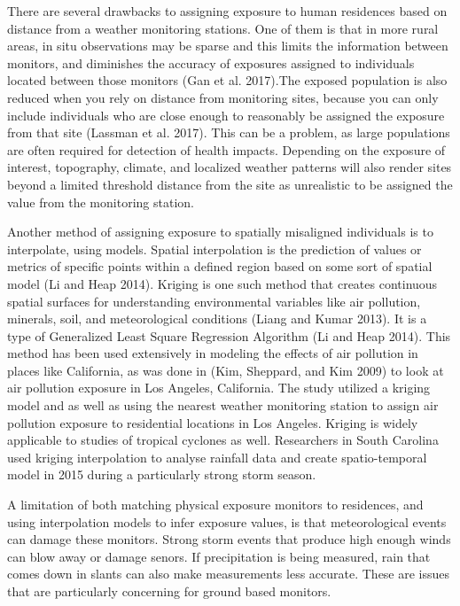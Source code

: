 \documentclass[
]{article}
\begin{document}
There are several drawbacks to assigning exposure to human residences
based on distance from a weather monitoring stations. One of them is
that in more rural areas, in situ observations may be sparse and this
limits the information between monitors, and diminishes the accuracy of
exposures assigned to individuals located between those monitors (Gan et
al. 2017).The exposed population is also reduced when you rely on
distance from monitoring sites, because you can only include individuals
who are close enough to reasonably be assigned the exposure from that
site (Lassman et al. 2017). This can be a problem, as large populations
are often required for detection of health impacts. Depending on the
exposure of interest, topography, climate, and localized weather
patterns will also render sites beyond a limited threshold distance from
the site as unrealistic to be assigned the value from the monitoring
station.

Another method of assigning exposure to spatially misaligned individuals
is to interpolate, using models. Spatial interpolation is the prediction
of values or metrics of specific points within a defined region based on
some sort of spatial model (Li and Heap 2014). Kriging is one such
method that creates continuous spatial surfaces for understanding
environmental variables like air pollution, minerals, soil, and
meteorological conditions (Liang and Kumar 2013). It is a type of
Generalized Least Square Regression Algorithm (Li and Heap 2014). This
method has been used extensively in modeling the effects of air
pollution in places like California, as was done in (Kim, Sheppard, and
Kim 2009) to look at air pollution exposure in Los Angeles, California.
The study utilized a kriging model and as well as using the nearest
weather monitoring station to assign air pollution exposure to
residential locations in Los Angeles. Kriging is widely applicable to
studies of tropical cyclones as well. Researchers in South Carolina used
kriging interpolation to analyse rainfall data and create
spatio-temporal model in 2015 during a particularly strong storm season.

A limitation of both matching physical exposure monitors to residences,
and using interpolation models to infer exposure values, is that
meteorological events can damage these monitors. Strong storm events
that produce high enough winds can blow away or damage senors. If
precipitation is being measured, rain that comes down in slants can also
make measurements less accurate. These are issues that are particularly
concerning for ground based monitors.
\end{document}
